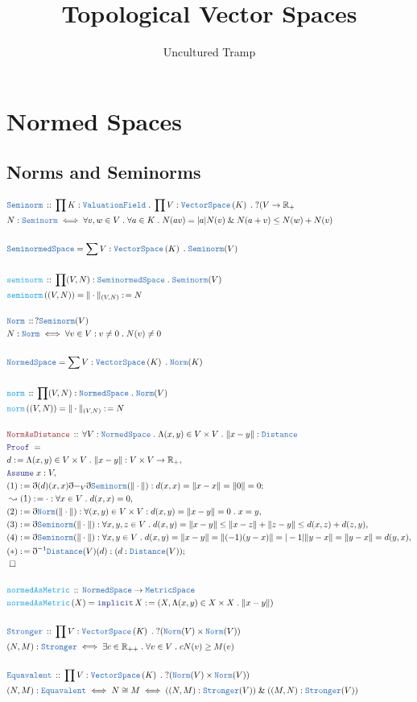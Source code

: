 \documentclass[12pt]{scrartcl}
\author{Uncultured Tramp}
\title{Topological Vector Spaces}
\newcommand{\TYPE}[1]{\textcolor{NavyBlue}{\mathtt{#1}}}
\newcommand{\FUNC}[1]{\textcolor{Cerulean}{\mathtt{#1}}}
\newcommand{\LOGIC}[1]{\textcolor{Blue}{\mathtt{#1}}}
\newcommand{\THM}[1]{\textcolor{Maroon}{\mathtt{#1}}}
\renewcommand{\.}{\; . \;}
\newcommand{\de}{: \kern 0.1pc =}
\newcommand{\Act}[1]{\left( #1 \right)}
\newcommand{\Theorem}[2]{& \THM{#1} \, :: \, #2 \\ & \Proof = \\ }
\newcommand{\DeclareType}[2]{& \TYPE{#1} \, :: \, #2 \\}
\newcommand{\DefineType}[3]{& #1 : \TYPE{#2} \iff #3 \\}
\newcommand{\DefineNamedType}[4]{& #1 : \TYPE{#2} \iff #3 \iff #4 \\}
\newcommand{\DeclareFunc}[2]{& \FUNC{#1} \, :: \, #2 \\}
\newcommand{\DefineNamedFunc}[4]{&  \FUNC{#1}\Act{#2} = #3 \de #4 \\}
\newcommand{\Page}[1]{\begin{align*} #1 \end{align*} \newpage   }
\renewcommand{\And}{\; \& \;}
\newcommand{\Reals}{\mathbb{R} }
\newcommand{\Say}[3]{& #1 \de #2 : #3, \\}
\newcommand{\Conclude}[3]{& #1 \de #2 : #3; \\}
\newcommand{\Derive}[3]{& \leadsto #1 \de #2 : #3, \\}
\newcommand{\A}{\LOGIC{Assume} \;}
\newcommand{\Assume}[2]{& \A #1 : #2, \\}
\newcommand{\QED}{\; \square}
\newcommand{\EndProof}{& \QED \\}
\newcommand{\ByDef}{\eth}
\newcommand{\Proof}{\LOGIC{Proof} \; }
\newcommand{\VS}[1]{\TYPE{VectorSpace}\left( #1 \right)}
\newcommand{\MS}{\TYPE{MetricSpace}}
\newcommand{\NS}{\TYPE{NormedSpace}}
\newcommand{\SNS}{\TYPE{SeminormedSpace}}
\begin{document}
\maketitle
\begin{center}
\end{center}
\newpage
\tableofcontents
\newpage
\section{Normed Spaces}
\subsection{Norms and Seminorms}
\Page{
\DeclareType{Seminorm}{ \prod K : \TYPE{ValuationField} \. \prod V : \VS{K} \. ? (V \to \Reals_+ }
\DefineType{N}{ Seminorm  }{ \forall v,w \in V \. \forall a \in K \. N(av) = |a|N(v) \And N(a + v) \le N(w) + N(v) }
\\
& \SNS = \sum V : \VS{K} \. \TYPE{Seminorm}(V)
\\ \\
\DeclareFunc{seminorm}{ \prod (V,N) : \SNS  \. \TYPE{Seminorm}(V)}
\DefineNamedFunc{seminorm}{(V,N)}{ \| \cdot \|_{(V,N)} }{ N  }
\\
\DeclareType{Norm}{ ? \TYPE{Seminorm}(V)  }
\DefineType{N}{Norm}{ \forall v \in V : v \neq 0 \. N(v) \neq 0 }
\\
& \TYPE{NormedSpace} = \sum V : \VS{K} \. \TYPE{Norm}(K)
\\ \\
\DeclareFunc{norm}{ \prod (V,N) : \TYPE{NormedSpace} \. \TYPE{Norm}(V)}
\DefineNamedFunc{norm}{(V,N)}{ \| \cdot \|_{(V,N)} }{ N  }
\\
\Theorem{ NormAsDistance  }{ \forall V : \TYPE{NormedSpace} \. \Lambda (x, y) \in V \times V \. \| x - y  \| : \TYPE{Distance}}
\Say{d}{ \Lambda  (x,y) \in V \times V \. \| x -  y \|  }{ V \times V \to \Reals_+ }
\Assume{x}{V}
\Conclude{(1)}{ \ByDef(d)(x,x)\ByDef{ -_V }\ByDef\TYPE{Seminorm}(\| \cdot \|)     }{ d(x,x) = \| x - x \| = \| 0 \| = 0 }
\Derive{(1)}{ \cdot }{\forall x \in V \. d(x,x) = 0}
\Say{(2)}{\ByDef\TYPE{Norm}(\| \cdot \|)}{\forall (x,y) \in V \times V : d(x,y) = \| x - y \| = 0 \. x = y}
\Say{(3)}{\ByDef\TYPE{Seminorm}(\| \cdot \|)}{ \forall x,y,z \in V \. d(x,y) = \| x - y \| \le \| x - z \| + \| z - y \| \le d(x,z) + d(z,y)  }
\Say{(4)}{\ByDef\TYPE{Seminorm}(\| \cdot \|)}{\forall x,y \in V \. d(x,y) = \| x - y \| = \| (-1)(y - x) \| = | -1 | \| y - x \| = \| y - x \| = d(y,x) }
\Conclude{(*)}{\ByDef^{-1}\TYPE{ Distance }(V)(d) }{ (d : \TYPE{Distance}(V))  }
\EndProof
\\
\DeclareFunc{ normedAsMetric   }{ \NS \to \MS   }
\DefineNamedFunc{ normedAsMetric  }{X}{ \LOGIC{implicit} \, X }{ (X, \Lambda (x,y) \in X \times X \. \| x - y \| )  }
\\
\DeclareType{ Stronger }{ \prod V : \VS{K} \. ?(\TYPE{Norm}(V) \times \TYPE{Norm}(V))  }
\DefineType{(N,M)}{ Stronger }{ \exists c \in \Reals_{++} \. \forall v \in V \. cN(v) \ge M(v)  }
\\
\DeclareType{Equavalent}{\prod V : \VS{K} \. ?(\TYPE{Norm}(V) \times \TYPE{Norm}(V))}
\DefineNamedType{(N,M)}{Equavalent}{N \cong M}{ ((N,M) : \TYPE{Stronger}(V) ) \And ((M,N) : \TYPE{Stronger}(V))} 
}
\end{document}
